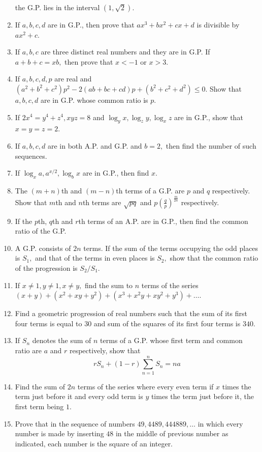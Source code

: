 \begin{enumerate}
  the G.P. lies in the interval $(1, \sqrt{2})$.
\item If $a, b, c, d$ are in G.P., then prove that $ax^3 + bx^2 + cx + d$ is divisible by $ax^2 + c$.
\item If $a, b, c$ are three distinct real numbers and they are in G.P. If $a + b + c = xb,$ then prove that $x < -1$ or
  $x > 3$.
\item If $a, b, c, d, p$ are real and $(a^2 + b^2 + c^2)p^2 - 2(ab + bc + cd)p + (b^2 + c^2 + d^2)\leq 0.$ Show that $a,
  b, c, d$ are in G.P. whose common ratio is $p$.
\item If $2x^4 = y^4 + z^4, xyz = 8$ and $\log_yx, \log_zy, \log_xz$ are in G.P., show that $x = y = z = 2$.
\item If $a, b, c, d$ are in both A.P. and G.P. and $b = 2,$ then find the number of such sequences.
\item If $\log_x a, a^{x/2}, \log_b x$ are in G.P., then find $x.$
\item The $(m + n)$th and $(m - n)$th terms of a G.P. are $p$ and $q$ respectively. Show that $m$th and $n$th terms are
  $\sqrt{pq}$ and $p\left(\frac{q}{p}\right)^\frac{m}{2n}$ respectively.
\item If the $p$th, $q$th and $r$th terms of an A.P. are in G.P., then find the common ratio of the G.P.
\item A G.P. consists of $2n$ terms. If the sum of the terms occupying the odd places is $S_1,$ and that of the terms in
  even places is $S_2,$ show that the common ratio of the progression is $S_2/S_1$.
\item If $x\neq 1, y\neq 1, x \neq y,$ find the sum to $n$ terms of the series $(x + y) + (x^2 + xy + y^2) + (x^3 + x^2y +
  xy^2 + y^3) + \ldots$.
\item Find a geometric progression of real numbers such that the sum of its first four terms is equal to $30$ and sum of
  the squares of its first four terms is $340$.
\item If $S_n$ denotes the sum of $n$ terms of a G.P. whose first term and common ratio are $a$ and $r$ respectively, show
  that $$rS_n + (1 - r)\sum_{n = 1}^nS_n = na$$
\item Find the sum of $2n$ terms of the series where every even term if $x$ times the term just before it and every odd
  term is $y$ times the term just before it, the first term being $1$.
\item Prove that in the sequence of numbers $49, 4489, 444889, \ldots$ in which every number is made by inserting $48$ in
  the middle of previous number as indicated, each number is the square of an integer.

\end{enumerate}
